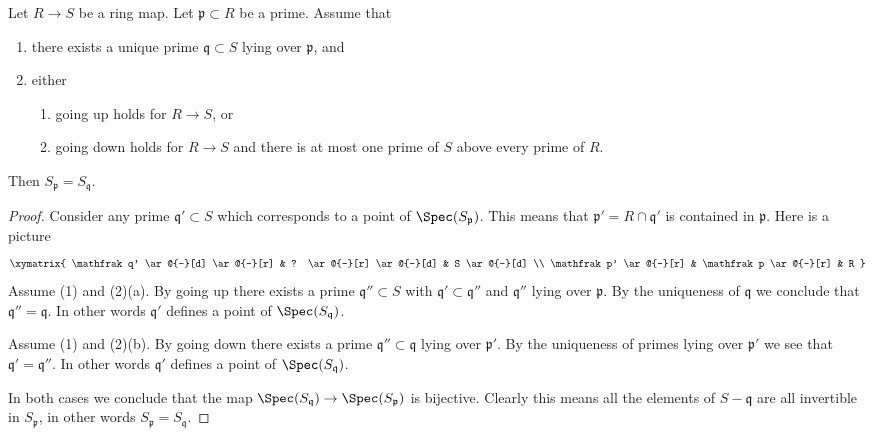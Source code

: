 \begin{lemma}
\label{lemma-unique-prime-over-localize-below}
Let $R \to S$ be a ring map.
Let $\mathfrak p \subset R$ be a prime.
Assume that
\begin{enumerate}
\item there exists a unique prime $\mathfrak q \subset S$ lying over
$\mathfrak p$, and
\item either
\begin{enumerate}
\item going up holds for $R \to S$, or
\item going down holds for $R \to S$ and there is at most one prime
of $S$ above every prime of $R$.
\end{enumerate}
\end{enumerate}
Then $S_{\mathfrak p} = S_{\mathfrak q}$.
\end{lemma}

\begin{proof}
Consider any prime $\mathfrak q' \subset S$ which corresponds to
a point of $\Spec(S_{\mathfrak p})$. This means that
$\mathfrak p' = R \cap \mathfrak q'$ is contained in $\mathfrak p$.
Here is a picture
$$
\xymatrix{
\mathfrak q' \ar@{-}[d] \ar@{-}[r] & ? \ar@{-}[r] \ar@{-}[d] & S \ar@{-}[d] \\
\mathfrak p' \ar@{-}[r] & \mathfrak p \ar@{-}[r] & R
}
$$
Assume (1) and (2)(a).
By going up there exists a prime $\mathfrak q'' \subset S$
with $\mathfrak q' \subset \mathfrak q''$ and $\mathfrak q''$
lying over $\mathfrak p$. By the uniqueness of $\mathfrak q$ we
conclude that $\mathfrak q'' = \mathfrak q$. In other words
$\mathfrak q'$ defines a point of $\Spec(S_{\mathfrak q})$.

\medskip\noindent
Assume (1) and (2)(b).
By going down there exists a prime $\mathfrak q'' \subset \mathfrak q$
lying over $\mathfrak p'$. By the uniqueness of primes lying over
$\mathfrak p'$ we see that $\mathfrak q' = \mathfrak q''$.  In other words
$\mathfrak q'$ defines a point of $\Spec(S_{\mathfrak q})$.

\medskip\noindent
In both cases we conclude that the map
$\Spec(S_{\mathfrak q}) \to \Spec(S_{\mathfrak p})$
is bijective. Clearly this means all the elements of $S - \mathfrak q$
are all invertible in $S_{\mathfrak p}$, in other words
$S_{\mathfrak p} = S_{\mathfrak q}$.
\end{proof}